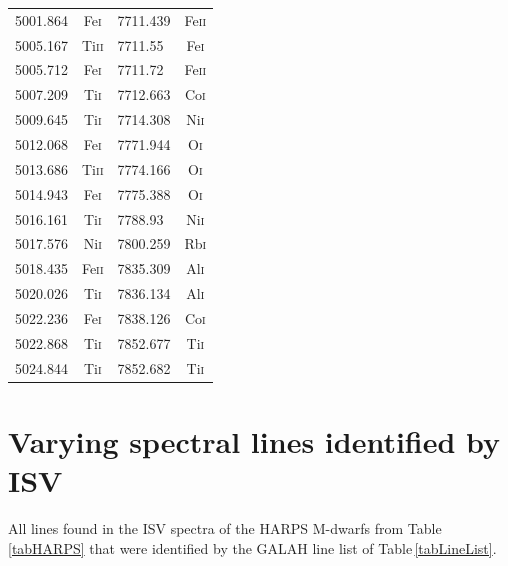 \begin{longtable}[c]{|l|c|l|c|}
5001.864 & Fe\textsc{i} & 7711.439 & Fe\textsc{ii}\\ 
5005.167 & Ti\textsc{ii} & 7711.55 & Fe\textsc{i}\\  
5005.712 & Fe\textsc{i} & 7711.72 & Fe\textsc{ii}\\  
5007.209 & Ti\textsc{i} & 7712.663 & Co\textsc{i}\\  
5009.645 & Ti\textsc{i} & 7714.308 & Ni\textsc{i}\\  
5012.068 & Fe\textsc{i} & 7771.944 & O\textsc{i}\\   
5013.686 & Ti\textsc{ii} & 7774.166 & O\textsc{i}\\  
5014.943 & Fe\textsc{i} & 7775.388 & O\textsc{i}\\   
5016.161 & Ti\textsc{i} & 7788.93 & Ni\textsc{i}\\   
5017.576 & Ni\textsc{i} & 7800.259 & Rb\textsc{i}\\  
5018.435 & Fe\textsc{ii} & 7835.309 & Al\textsc{i}\\ 
5020.026 & Ti\textsc{i} & 7836.134 & Al\textsc{i}\\  
5022.236 & Fe\textsc{i} & 7838.126 & Co\textsc{i}\\  
5022.868 & Ti\textsc{i} & 7852.677 & Ti\textsc{i}\\  
5024.844 & Ti\textsc{i} & 7852.682 & Ti\textsc{i}\\             
\end{longtable}

\chapter{Varying spectral lines identified by ISV}
All lines found in the ISV spectra of the HARPS M-dwarfs from Table\,\ref{tabHARPS} that were identified by the GALAH line list of Table\,\ref{tabLineList}.\\

